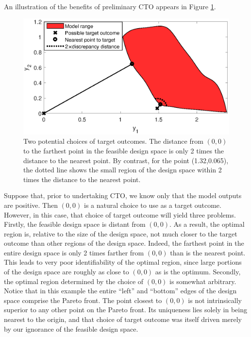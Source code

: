 \documentclass[12pt]{article}
\begin{document}
An illustration of the benefits of preliminary CTO appears in Figure \ref{fig:do_selection_example}.
%
\begin{figure}
\centering
\includegraphics[scale=.8]{FIG_des_obs_selection_example.eps}
\caption{Two potential choices of target outcomes. 
%
The distance from $(0,0)$ to the farthest point in the feasible design space is only 2 times the distance to the nearest point. 
%
By contrast, for the point (1.32,0.065), the dotted line shows the small region of the design space within 2 times the distance to the nearest point.}
\label{fig:do_selection_example}
\end{figure}
%
Suppose that, prior to undertaking CTO, we know only that the model outputs are positive.
%
Then $(0,0)$ is a natural choice to use as a target outcome.
%
However, in this case, that choice of target outcome will yield three problems.
%
Firstly, the feasible design space is distant from $(0,0)$.
%
As a result, the optimal region is, relative to the size of the design space, not much closer to the target outcome than other regions of the design space.
%
Indeed, the farthest point in the entire design space is only 2 times farther from $(0,0)$ than is the nearest point.
%
This leads to very poor identifiability of the optimal region, since large portions of the design space are roughly as close to $(0,0)$ as is the optimum.
%
Secondly, the optimal region determined by the choice of $(0,0)$ is somewhat arbitrary.
%
Notice that in this example the entire ``left'' and ``bottom''  edges of the design space comprise the Pareto front.
%
The point closest to $(0,0)$ is not intrinsically superior to any other point on the Pareto front.
%
Its uniqueness lies solely in being nearest to the origin, and that choice of target outcome was itself driven merely by our ignorance of the feasible design space.
\end{document}
